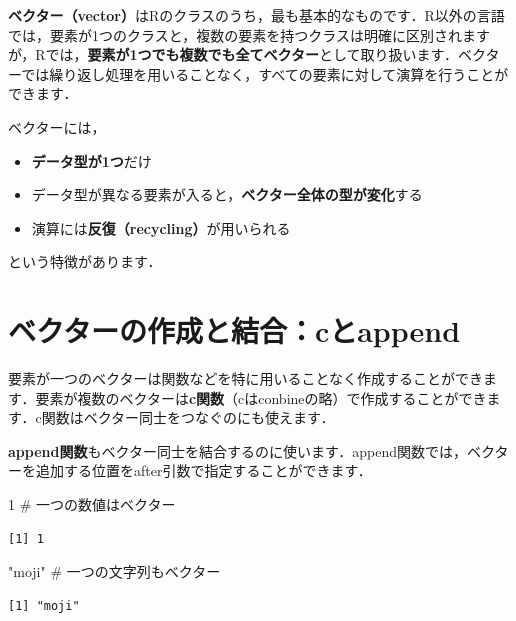 \documentclass[
  letterpaper,
  DIV=11,
  numbers=noendperiod]{scrreprt}
\newenvironment{Shaded}{\begin{snugshade}}{\end{snugshade}}
\newcommand{\CommentTok}[1]{\textcolor[rgb]{0.37,0.37,0.37}{#1}}
\newcommand{\DecValTok}[1]{\textcolor[rgb]{0.68,0.00,0.00}{#1}}
\newcommand{\StringTok}[1]{\textcolor[rgb]{0.13,0.47,0.30}{#1}}
\providecommand{\tightlist}{%
  \setlength{\itemsep}{0pt}\setlength{\parskip}{0pt}}\usepackage{longtable,booktabs,array}
\begin{document}
\textbf{ベクター（vector）}はRのクラスのうち，最も基本的なものです．R以外の言語では，要素が1つのクラスと，複数の要素を持つクラスは明確に区別されますが，Rでは，\textbf{要素が1つでも複数でも全てベクター}として取り扱います．ベクターでは繰り返し処理を用いることなく，すべての要素に対して演算を行うことができます．

ベクターには，

\begin{itemize}
\tightlist
\item
  \textbf{データ型が1つ}だけ
\item
  データ型が異なる要素が入ると，\textbf{ベクター全体の型が変化}する
\item
  演算には\textbf{反復（recycling）}が用いられる
\end{itemize}

という特徴があります．

\hypertarget{ux30d9ux30afux30bfux30fcux306eux4f5cux6210ux3068ux7d50ux5408cux3068append}{%
\section{ベクターの作成と結合：cとappend}\label{ux30d9ux30afux30bfux30fcux306eux4f5cux6210ux3068ux7d50ux5408cux3068append}}

要素が一つのベクターは関数などを特に用いることなく作成することができます．要素が複数のベクターは\textbf{c関数}（cはconbineの略）で作成することができます．c関数はベクター同士をつなぐのにも使えます．

\textbf{append関数}もベクター同士を結合するのに使います．append関数では，ベクターを追加する位置をafter引数で指定することができます．

\begin{Shaded}
\begin{Highlighting}[]
\DecValTok{1} \CommentTok{\# 一つの数値はベクター}
\end{Highlighting}
\end{Shaded}

\begin{verbatim}
[1] 1
\end{verbatim}

\begin{Shaded}
\begin{Highlighting}[]
\StringTok{"moji"} \CommentTok{\# 一つの文字列もベクター}
\end{Highlighting}
\end{Shaded}

\begin{verbatim}
[1] "moji"
\end{verbatim}
\end{document}
